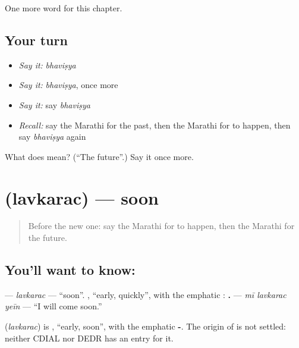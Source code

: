 \begin{grammarlens}[title={What you've built}]
One more word for this chapter.
\end{grammarlens}

\subsection*{Your turn}
\begin{itemize}
\raggedright
  \item \emph{Say it:} \emph{bhaviṣya}
  \item \emph{Say it:} \emph{bhaviṣya}, once more
  \item \emph{Say it:} say \emph{bhaviṣya}
  \item \emph{Recall:} say the Marathi for the past, then the Marathi for to happen, then say \emph{bhaviṣya} again
\end{itemize}

\begin{tcolorbox}[breakable,colback=teal!4,colframe=teal!35!black,title={Before you move on}]
What does  mean? (\textquotedblleft{}The future\textquotedblright{}.) Say it once more.
\end{tcolorbox}
\section[\texorpdfstring{\mr{लवकरच} (lavkarac)}{लवकरच (lavkarac)}]{ (lavkarac) — soon}

\label{lesson:MR-C160-lavkarac}



\begin{quote}
Before the new one: say the Marathi for to happen, then the Marathi for the future.
\end{quote}

\subsection*{You'll want to know: }
\textbf{} — \emph{lavkarac} — \textquotedblleft{}soon\textquotedblright{}. \textbf{}, \textquotedblleft{}early, quickly\textquotedblright{}, with the emphatic \textbf{}: \textbf{  .} — \emph{mī lavkarac yeīn} — \textquotedblleft{}I will come soon.\textquotedblright{}

\begin{cousinweb}
\textbf{} (\emph{lavkarac}) is \textbf{}, \textquotedblleft{}early, soon\textquotedblright{}, with the emphatic \textbf{-}. The origin of \textbf{} is not settled: neither CDIAL nor DEDR has an entry for it.
\end{cousinweb}

